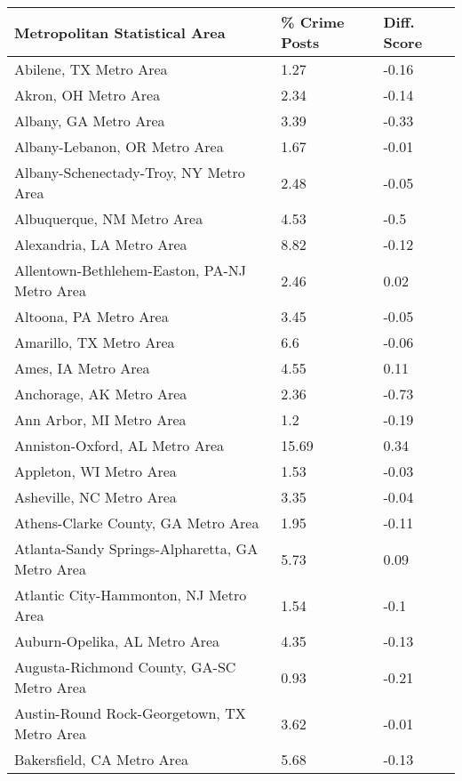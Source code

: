 \documentclass[12pt,oneside, letterpaper]{book}
\begin{document}
\begin{longtable}{| p{} | p{} | p{} |}
    \hline
    Metropolitan Statistical Area & \% Crime Posts & Diff. Score \\ \hline
    Abilene, TX Metro Area & 1.27 & -0.16 \\ \hline
    Akron, OH Metro Area & 2.34 & -0.14 \\ \hline
    Albany, GA Metro Area & 3.39 & -0.33 \\ \hline
    Albany-Lebanon, OR Metro Area & 1.67 & -0.01 \\ \hline
    Albany-Schenectady-Troy, NY Metro Area & 2.48 & -0.05 \\ \hline
    Albuquerque, NM Metro Area & 4.53 & -0.5 \\ \hline
    Alexandria, LA Metro Area & 8.82 & -0.12 \\ \hline
    Allentown-Bethlehem-Easton, PA-NJ Metro Area & 2.46 & 0.02 \\ \hline
    Altoona, PA Metro Area & 3.45 & -0.05 \\ \hline
    Amarillo, TX Metro Area & 6.6 & -0.06 \\ \hline
    Ames, IA Metro Area & 4.55 & 0.11 \\ \hline
    Anchorage, AK Metro Area & 2.36 & -0.73 \\ \hline
    Ann Arbor, MI Metro Area & 1.2 & -0.19 \\ \hline
    Anniston-Oxford, AL Metro Area & 15.69 & 0.34 \\ \hline
    Appleton, WI Metro Area & 1.53 & -0.03 \\ \hline
    Asheville, NC Metro Area & 3.35 & -0.04 \\ \hline
    Athens-Clarke County, GA Metro Area & 1.95 & -0.11 \\ \hline
    Atlanta-Sandy Springs-Alpharetta, GA Metro Area & 5.73 & 0.09 \\ \hline
    Atlantic City-Hammonton, NJ Metro Area & 1.54 & -0.1 \\ \hline
    Auburn-Opelika, AL Metro Area & 4.35 & -0.13 \\ \hline
    Augusta-Richmond County, GA-SC Metro Area & 0.93 & -0.21 \\ \hline
    Austin-Round Rock-Georgetown, TX Metro Area & 3.62 & -0.01 \\ \hline
    Bakersfield, CA Metro Area & 5.68 & -0.13 \\ \hline

\end{longtable}
\end{document}
